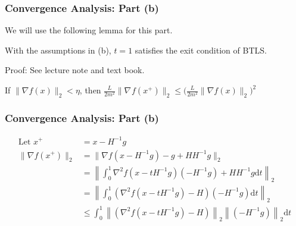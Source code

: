 \documentclass{beamer}
\begin{document}
\begin{frame}
    \frametitle{Convergence Analysis: Part (b)}
	We will use the following lemma for this part.
    \begin{lemma}
        With the assumptions in (b), $t = 1$ satisfies the exit condition of BTLS.
    \end{lemma}
    Proof: See lecture note and text book.
    
    \begin{theorem}[Part (b)]
        If $\|\nabla f(x)\|_2 < \eta$, then 
        $ \frac{L}{2m^2} \|\nabla_{}f(x^{+})\|_2 \leq
                \bigg(\frac{L}{2m^2} \|\nabla f(x)\|_2 \bigg)^2 $
    \end{theorem}

\end{frame}
\begin{frame}
    \frametitle{Convergence Analysis: Part (b)}
    \begin{align}
        \text{Let } x^+ &= x - H^{-1}g \tag{BTLS Quad. Lemma} \\
    \| \nabla f(x^{+})\|_2 &= \| \nabla f(x-H^{-1}g) - g + HH^{-1}g \|_2 \tag{Add zero} \\
	&= \left\|\int_{0}^{1} \nabla^2 f(x-tH^{-1}g) (-H^{-1}g) + HH^{-1}g \mathrm{d}t \right\|_2 \tag{Fund. Theorem of Calculus} \\
	&= \left\| \int_{0}^{1} (\nabla^2 f(x-tH^{-1}g) - H) (-H^{-1}g) \mathrm{d}t \right\|_2 \tag{Rearrange} \\
	&\leq \int_{0}^{1} \left\| (\nabla^2 f(x-tH^{-1}g) - H)\right\|_2 \left\| (-H^{-1}g)\right\|_2 \mathrm{d}t  \tag{Triangle inequality of norms}
    \end{align}
\end{frame}
\end{document}
